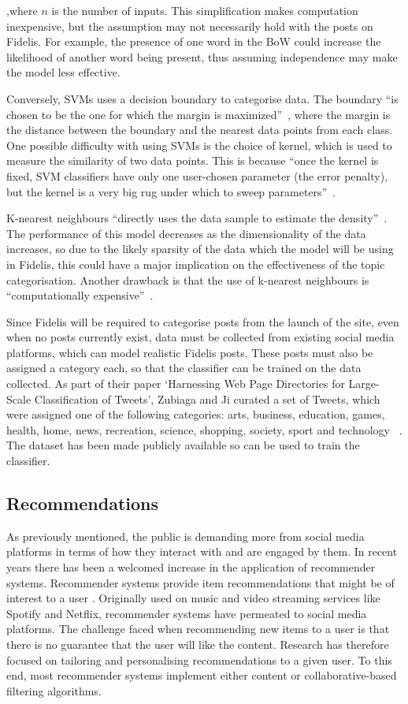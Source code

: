 \noindent ,where $n$ is the number of inputs. This simplification makes computation inexpensive, but the assumption may not necessarily hold with the posts on Fidelis. For example, the presence of one word in the BoW could increase the likelihood of another word being present, thus assuming independence may make the model less effective.

Conversely, SVMs uses a decision boundary to categorise data. The boundary ``is chosen to be the one for which the margin is maximized''~\cite{Bishop:SVM}, where the margin is the distance between the boundary and the nearest data points from each class. One possible difficulty with using SVMs is the choice of kernel, which is used to measure the similarity of two data points. This is because ``once the kernel is fixed, SVM classifiers have only one user-chosen parameter (the error penalty), but the kernel is a very big rug under which to sweep parameters''~\cite{Burges:SVM}.

K-nearest neighbours ``directly uses the data sample to estimate the density''~\cite{Zaki:KNN}. The performance of this model decreases as the dimensionality of the data increases, so due to the likely sparsity of the data which the model will be using in Fidelis, this could have a major implication on the effectiveness of the topic categorisation. Another drawback is that the use of k-nearest neighbours is ``computationally expensive''~\cite{Kuncheva:KNN}.

Since Fidelis will be required to categorise posts from the launch of the site, even when no posts currently exist, data must be collected from existing social media platforms, which can model realistic Fidelis posts. These posts must also be assigned a category each, so that the classifier can be trained on the data collected. As part of their paper `Harnessing Web Page Directories for Large-Scale Classification of Tweets', Zubiaga and Ji curated a set of Tweets, which were assigned one of the following categories: arts, business, education, games, health, home, news, recreation, science, shopping, society, sport and technology ~\cite{Zubiaga:Tweets}. The dataset has been made publicly available so can be used to train the classifier.

\subsection{Recommendations}
As previously mentioned, the public is demanding more from social media platforms in terms of how they interact with and are engaged by them. In recent years there has been a welcomed increase in the application of recommender systems. Recommender systems provide item recommendations that might be of interest to a user \cite{ricci2011introduction}. Originally used on music and video streaming services like Spotify and Netflix, recommender systems have permeated to social media platforms. The challenge faced when recommending new items to a user is that there is no guarantee that the user will like the content. Research has therefore focused on tailoring and personalising recommendations to a given user. To this end, most recommender systems implement either content or collaborative-based filtering algorithms.

